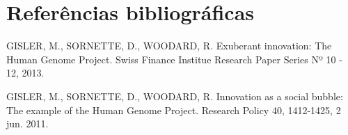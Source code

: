 \chapter*{Referências bibliográficas}

GISLER, M., SORNETTE, D., WOODARD, R. Exuberant innovation: The Human Genome Project. Swiss Finance Institue Research Paper Series Nº 10 - 12, 2013.

GISLER, M., SORNETTE, D., WOODARD, R. Innovation as a social bubble: The example of the Human Genome Project. Research Policy 40, 1412-1425, 2 jun. 2011.
